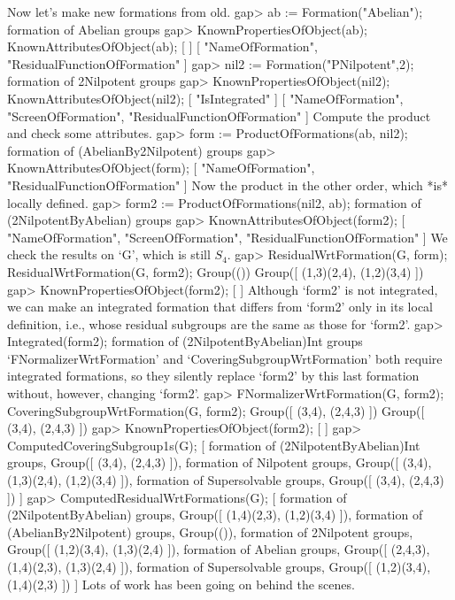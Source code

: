 Now let's make new formations from old.
\beginexample
gap> ab := Formation("Abelian");
formation of Abelian groups
gap> KnownPropertiesOfObject(ab); KnownAttributesOfObject(ab);
[  ]
[ "NameOfFormation", "ResidualFunctionOfFormation" ]
gap> nil2 := Formation("PNilpotent",2);
formation of 2Nilpotent groups
gap> KnownPropertiesOfObject(nil2); KnownAttributesOfObject(nil2);
[ "IsIntegrated" ]
[ "NameOfFormation", "ScreenOfFormation", "ResidualFunctionOfFormation" ]
\endexample
Compute the product and check some attributes.
\beginexample
gap> form := ProductOfFormations(ab, nil2);
formation of (AbelianBy2Nilpotent) groups
gap> KnownAttributesOfObject(form);
[ "NameOfFormation", "ResidualFunctionOfFormation" ]
\endexample
Now the product in the other order, which *is* locally defined.
\beginexample
gap> form2 := ProductOfFormations(nil2, ab);
formation of (2NilpotentByAbelian) groups
gap> KnownAttributesOfObject(form2);
[ "NameOfFormation", "ScreenOfFormation", "ResidualFunctionOfFormation" ]
\endexample
We check the results on `G', which is still $S_4$.
\beginexample
gap> ResidualWrtFormation(G, form);  ResidualWrtFormation(G, form2);
Group(())
Group([ (1,3)(2,4), (1,2)(3,4) ])
gap> KnownPropertiesOfObject(form2);
[  ]
\endexample
Although `form2' is not integrated, we can make an integrated formation
that differs from `form2' only in its local definition, i.e., whose
residual subgroups are the same as those for `form2'.
\beginexample
gap> Integrated(form2);
formation of (2NilpotentByAbelian)Int groups
\endexample
`FNormalizerWrtFormation' and
`CoveringSubgroupWrtFormation' both require integrated formations, so they
silently replace `form2' by this last formation without, however,
changing `form2'. 
\beginexample
gap> FNormalizerWrtFormation(G, form2); CoveringSubgroupWrtFormation(G, form2);
Group([ (3,4), (2,4,3) ])
Group([ (3,4), (2,4,3) ])
gap> KnownPropertiesOfObject(form2);
[  ]
gap> ComputedCoveringSubgroup1s(G);
[ formation of (2NilpotentByAbelian)Int groups, Group([ (3,4), (2,4,3) ]), 
  formation of Nilpotent groups, Group([ (3,4), (1,3)(2,4), (1,2)(3,4) ]), 
  formation of Supersolvable groups, Group([ (3,4), (2,4,3) ]) ]
gap> ComputedResidualWrtFormations(G);
[ formation of (2NilpotentByAbelian) groups, 
  Group([ (1,4)(2,3), (1,2)(3,4) ]), 
  formation of (AbelianBy2Nilpotent) groups, Group(()), 
  formation of 2Nilpotent groups, Group([ (1,2)(3,4), (1,3)(2,4) ]), 
  formation of Abelian groups, Group([ (2,4,3), (1,4)(2,3), (1,3)(2,4) ]), 
  formation of Supersolvable groups, Group([ (1,2)(3,4), (1,4)(2,3) ]) ]
\endexample
Lots of work has been going on behind the scenes.

